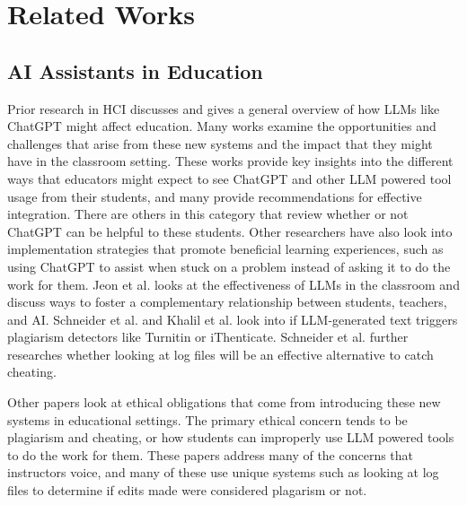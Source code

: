 \documentclass[manuscript,screen,acmsmall]{acmart}
\begin{document}
\section{Related Works} 

\subsection{AI Assistants in Education}

    Prior research in HCI discusses and gives a general overview of how LLMs like ChatGPT might affect education.
    Many works examine the opportunities and challenges that arise from these new systems and the impact that they might have in the classroom setting.
    These works provide key insights into the different ways that educators might expect to see ChatGPT and other LLM powered tool usage from their students, and many provide recommendations for effective integration.
    There are others in this category that review whether or not ChatGPT can be helpful to these students.
    Other researchers have also look into implementation strategies that promote beneficial learning experiences, such as using ChatGPT to assist when stuck on a problem instead of asking it to do the work for them.
    Jeon et al. looks at the effectiveness of LLMs in the classroom and discuss ways to foster a complementary relationship between students, teachers, and AI.
    Schneider et al. and Khalil et al. look into if LLM-generated text triggers plagiarism detectors like Turnitin or iThenticate.
    Schneider et al. further researches whether looking at log files will be an effective alternative to catch cheating. 
    
    Other papers look at ethical obligations that come from introducing these new systems in educational settings. The primary ethical concern tends to be plagiarism and cheating, or how students can improperly use LLM powered tools to do the work for them.
    These papers address many of the concerns that instructors voice, and many of these use unique systems such as looking at log files to determine if edits made were considered plagarism or not.
    
\end{document}
